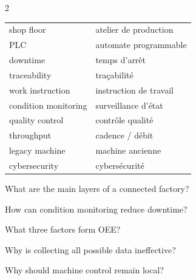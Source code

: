 \begin{multicols}{2}
\begin{tcolorbox}[title=\sffamily\bfseries OEE components,colback=white,colframe=ECGreen]
\begin{center}
\end{center}
\end{tcolorbox}

\begin{vocabulary}
\begin{tabularx}{\linewidth}{@{}lX@{}}
shop floor & atelier de production\\
PLC & automate programmable\\
downtime & temps d'arrêt\\
traceability & traçabilité\\
work instruction & instruction de travail\\
condition monitoring & surveillance d'état\\
quality control & contrôle qualité\\
throughput & cadence / débit\\
legacy machine & machine ancienne\\
cybersecurity & cybersécurité
\end{tabularx}
\end{vocabulary}

\begin{questions}
\item What are the main layers of a connected factory?
\item How can condition monitoring reduce downtime?
\item What three factors form OEE?
\item Why is collecting all possible data ineffective?
\item Why should machine control remain local?
\end{questions}


\end{multicols}
